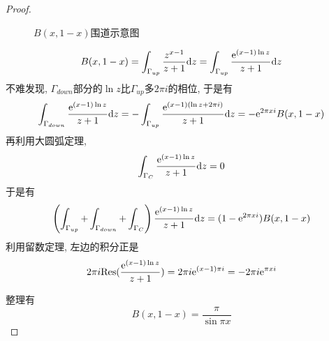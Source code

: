 \begin{proof}
\begin{figure}
        \caption{$B(x,1-x)$围道示意图}\label{B-x-1-x-contour}
    \end{figure}
    \begin{equation}
        B(x,1-x)=\int_{\Gamma_{up}}\frac{z^{x-1}}{z+1}\d z=\int_{\Gamma_{up}}\frac{\exp{(x-1)\ln z}}{z+1}\d z
    \end{equation}
    不难发现, $\Gamma_{down}$部分的$\ln z$比$\Gamma_{up}$多$2\pi i$的相位, 于是有
    \begin{equation}
        \int_{\Gamma_{down}}\frac{\exp{(x-1)\ln z}}{z+1}\d z=-\int_{\Gamma_{up}}\frac{\exp{(x-1)(\ln z+2\pi i)}}{z+1}\d z=-\exp{2\pi xi}B(x,1-x)
    \end{equation}
    再利用大圆弧定理, 
    \begin{equation}
        \int_{\Gamma_{C}}\frac{\exp{(x-1)\ln z}}{z+1}\d z=0
    \end{equation}
    于是有
    \begin{equation}
        \left(\int_{\Gamma_{up}}+\int_{\Gamma_{down}}+\int_{\Gamma_{C}}\right)\frac{\exp{(x-1)\ln z}}{z+1}\d z=(1-\exp{2\pi xi})B(x,1-x)
    \end{equation}
    利用留数定理, 左边的积分正是
    \begin{equation}
        2\pi i\rm{Res}(\frac{\exp{(x-1)\ln z}}{z+1})=2\pi i\exp{(x-1)\pi i}=-2\pi i\exp{\pi xi}
    \end{equation}

    整理有
    \begin{equation}
        B(x,1-x)=\frac{\pi}{\sin\pi x}
    \end{equation}
\end{proof}

